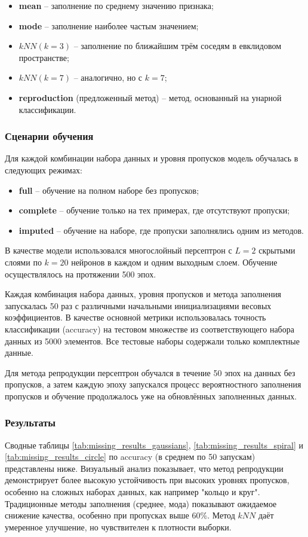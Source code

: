 \begin{itemize}
    \item \textbf{mean} -- заполнение по среднему значению признака;
    \item \textbf{mode} -- заполнение наиболее частым значением;
    \item \textbf{\(kNN (k=3)\)} -- заполнение по ближайшим трём соседям в евклидовом пространстве;
    \item \textbf{\(kNN (k=7)\)} -- аналогично, но с \(k=7\);
    \item \textbf{reproduction} (предложенный метод) -- метод, основанный на унарной классификации.
\end{itemize}

\subsubsection{Сценарии обучения}
Для каждой комбинации набора данных и уровня пропусков модель обучалась в следующих режимах:

\begin{itemize}
    \item \textbf{full} -- обучение на полном наборе без пропусков;
    \item \textbf{complete} -- обучение только на тех примерах, где отсутствуют пропуски;
    \item \textbf{imputed} -- обучение на наборе, где пропуски заполнялись одним из методов.
\end{itemize}

В качестве модели использовался многослойный персептрон с \(L=2\) скрытыми слоями по \(k=20\) нейронов в каждом и одним выходным слоем. Обучение осуществлялось на протяжении 500 эпох.

Каждая комбинация набора данных, уровня пропусков и метода заполнения запускалась 50 раз с различными начальными инициализациями весовых коэффициентов. В качестве основной метрики использовалась точность классификации (accuracy) на тестовом множестве из соответствующего набора данных из 5000 элементов. Все тестовые наборы содержали только комплектные данные.

Для метода репродукции персептрон обучался в течение 50 эпох на данных без пропусков, а затем каждую эпоху запускался процесс вероятностного заполнения пропусков и обучение продолжалось уже на обновлённых заполненных данных.

\subsubsection{Результаты}
Сводные таблицы \cref{tab:missing_results_gaussians}, \cref{tab:missing_results_spiral} и \cref{tab:missing_results_circle} по accuracy (в среднем по 50 запускам) представлены ниже. Визуальный анализ показывает, что метод репродукции демонстрирует более высокую устойчивость при высоких уровнях пропусков, особенно на сложных наборах данных, как например "кольцо и круг". Традиционные методы заполнения (среднее, мода) показывают ожидаемое снижение качества, особенно при пропусках выше 60\%. Метод \(kNN\) даёт умеренное улучшение, но чувствителен к плотности выборки.

